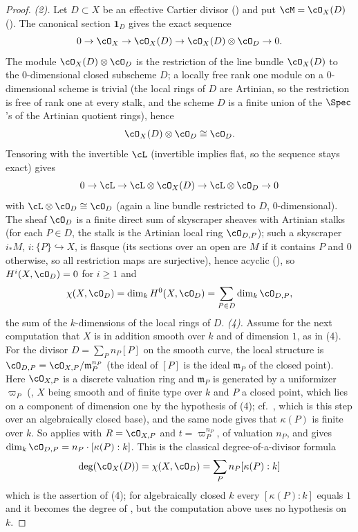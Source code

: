 \begin{proof}
\emph{(2).}  Let $D\subset X$ be an effective Cartier divisor
() and put $\cM=\cO_X(D)$
().  The canonical section $\mathbf 1_D$
gives the exact
sequence
\[
0\to\cO_X\to\cO_X(D)\to\cO_X(D)\otimes\cO_D\to0 .
\]
The module $\cO_X(D)\otimes\cO_D$ is the restriction of the line
bundle $\cO_X(D)$ to the $0$-dimensional closed subscheme $D$; a
locally free rank one module on a $0$-dimensional scheme is trivial
(the local rings of $D$ are Artinian, so the restriction is free of
rank one at every stalk, and the scheme $D$ is a finite union of the
$\Spec$'s of the Artinian quotient rings), hence
\[
\cO_X(D)\otimes\cO_D\cong\cO_D .
\]
Tensoring with the invertible $\cL$ (invertible implies flat, so the
sequence stays exact) gives
\[
0\to\cL\to\cL\otimes\cO_X(D)\to\cL\otimes\cO_D\to0
\]
with $\cL\otimes\cO_D\cong\cO_D$ (again a line bundle restricted to
$D$, $0$-dimensional).  The sheaf $\cO_D$ is a finite direct sum of
skyscraper sheaves with Artinian stalks (for each $P\in D$, the stalk
is the Artinian local ring $\cO_{D,P}$); such a skyscraper
$i_*M$, $i:\{P\}\hookrightarrow X$, is flasque (its sections over an
open are $M$ if it contains $P$ and $0$ otherwise, so all restriction
maps are surjective), hence acyclic
(), so $H^i(X,\cO_D)=0$ for $i\ge1$ and
\[
\chi(X,\cO_D)=\dim_kH^0(X,\cO_D)=\sum_{P\in D}\dim_k\cO_{D,P},
\]
the sum of the $k$-dimensions of the local rings of $D$.
\emph{(4).}  Assume for the next computation that $X$ is in addition
smooth over $k$ and of dimension $1$, as in (4).
For the divisor
$D=\sum_Pn_P[P]$ on the smooth curve, the local structure is
$\cO_{D,P}=\cO_{X,P}/\mathfrak m_P^{n_P}$ (the ideal of $[P]$ is the
ideal $\mathfrak m_P$ of the closed point).  Here $\cO_{X,P}$ is a
discrete valuation ring and $\mathfrak m_P$ is generated by a
uniformizer $\varpi_P$
(, $X$ being smooth and of finite
type over $k$ and $P$ a closed point, which lies on a component of
dimension one by the hypothesis of (4); cf.\
, which is this step over an algebraically
closed base), and the same node gives that $\kappa(P)$ is finite over
$k$.  So
 applies with $R=\cO_{X,P}$ and
$t=\varpi_P^{n_P}$, of valuation $n_P$, and gives
$\dim_k\cO_{D,P}=n_P\cdot[\kappa(P):k]$.  This is the classical
degree-of-a-divisor formula
\[
\deg(\cO_X(D))=\chi(X,\cO_D)=\sum_Pn_P[\kappa(P):k]
\]
which is the assertion of (4); for algebraically closed $k$ every
$[\kappa(P):k]$ equals $1$ and it becomes the degree of
, but the computation above uses no hypothesis on
$k$.


\end{proof}
